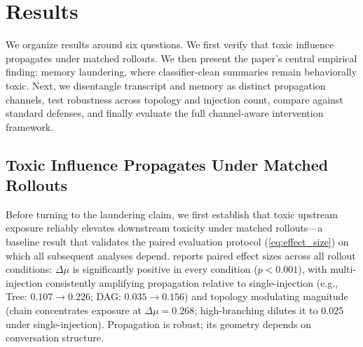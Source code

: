 \section{Results}
\label{sec:results}
We organize results around six questions. We first verify that toxic influence propagates under matched rollouts. We then present the paper's central empirical finding: memory laundering, where classifier-clean summaries remain behaviorally toxic. Next, we disentangle transcript and memory as distinct propagation channels, test robustness across topology and injection count, compare against standard defenses, and finally evaluate the full channel-aware intervention framework. 

\subsection{Toxic Influence Propagates Under Matched Rollouts}
\label{sec:results_propagation}
Before turning to the laundering claim, we first establish that toxic upstream exposure reliably elevates downstream toxicity under matched rollouts---a baseline result that validates the paired evaluation protocol (\cref{eq:effect_size}) on which all subsequent analyses depend.  reports paired effect sizes across all rollout conditions: $\Delta\mu$ is significantly positive in every condition ($p<0.001$), with multi-injection consistently amplifying propagation relative to single-injection (e.g., Tree: $0.107 \to 0.226$; DAG: $0.035 \to 0.156$) and topology modulating magnitude (chain concentrates exposure at $\Delta\mu = 0.268$; high-branching dilutes it to $0.025$ under single-injection). Propagation is robust; its geometry depends on conversation structure.



